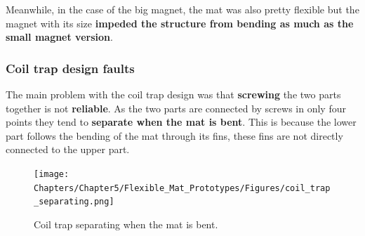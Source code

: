 Meanwhile, in the case of the big magnet, the mat was also pretty flexible but the magnet with its size \textbf{impeded the structure from bending as much as the small magnet version}.

\subsubsection{Coil trap design faults}
The main problem with the coil trap design was that \textbf{screwing} the two parts together is not \textbf{reliable}.
As the two parts are connected by screws in only four points they tend to \textbf{separate when the mat is bent}.
This is because the lower part follows the bending of the mat through its fins, these fins are not directly connected to the upper part.

\begin{figure}[H]
    \centering
    \texttt{[image: Chapters/Chapter5/Flexible\_Mat\_Prototypes/Figures/coil\_trap\_separating.png]}
    \caption{Coil trap separating when the mat is bent.}
    \label{fig: Coil_trap_separating}
\end{figure}